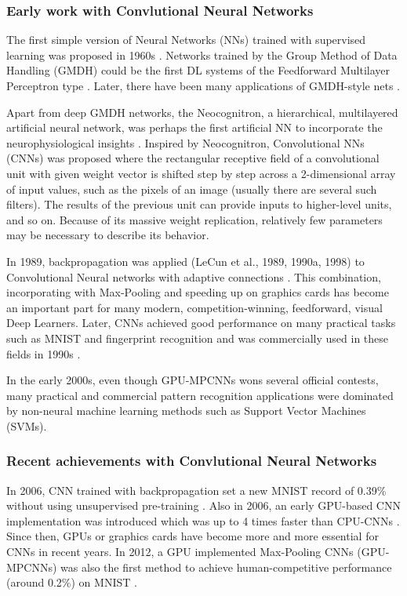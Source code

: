 \subsubsection{Early work with Convlutional Neural Networks}
The first simple version of Neural Networks (NNs) trained with supervised learning was proposed in 1960s  \cite{rosenblatt1958perceptron}\cite{rosenblatt1962principles}. Networks trained by the Group Method of Data Handling (GMDH) could be the first DL systems of the Feedforward Multilayer Perceptron type \cite{ivakhnenko1965cybernetic}\cite{Schmidhuber14}. Later, there have been many applications of GMDH-style
nets \cite{farlow1984self} \cite{ikeda1976sequential} \cite{kondo2008multi} \cite{witczak2006gmdh}.

Apart from deep GMDH networks, the Neocognitron, a hierarchical, multilayered artificial neural network, was perhaps the first artificial NN to incorporate the
neurophysiological insights \cite{fukushima1980neocognitron}. Inspired by Neocognitron, Convolutional NNs (CNNs) was proposed where the rectangular receptive field of a convolutional unit with given weight vector is shifted step by step across a 2-dimensional array of input values, such as the pixels of an image (usually there are several such filters). The results of the previous unit can provide inputs to higher-level units, and so on. Because of its massive weight replication,  relatively few parameters may be necessary to describe its behavior.

In 1989, backpropagation was applied (LeCun et al., 1989, 1990a, 1998) to Convolutional Neural networks with adaptive connections \cite{lecun1989backpropagation}. This combination, incorporating with Max-Pooling and speeding up on graphics cards has become an important part for  many modern, competition-winning, feedforward, visual Deep Learners. Later, CNNs achieved good performance on many practical tasks such as MNIST and fingerprint recognition and was commercially used in these fields in 1990s \cite{baldi1993neural} \cite{le1990handwritten}. 

In the early 2000s, even though GPU-MPCNNs wons several official contests, many practical and commercial pattern recognition applications were dominated by non-neural machine learning methods such as Support Vector Machines (SVMs).

\subsubsection{Recent achievements with Convlutional Neural Networks}
In 2006, CNN trained with backpropagation set a new MNIST record of 0.39\% without using unsupervised pre-training \cite{marc2006efficient}. Also in 2006, an early GPU-based CNN implementation was introduced which was up to 4 times faster than CPU-CNNs \cite{chellapilla2006high}. Since then, GPUs or graphics cards have become more and more essential for CNNs in recent years. In 2012, a GPU implemented Max-Pooling CNNs (GPU-MPCNNs) was also the first method to achieve human-competitive performance (around 0.2\%) on MNIST \cite{ciresan2012multi}.

